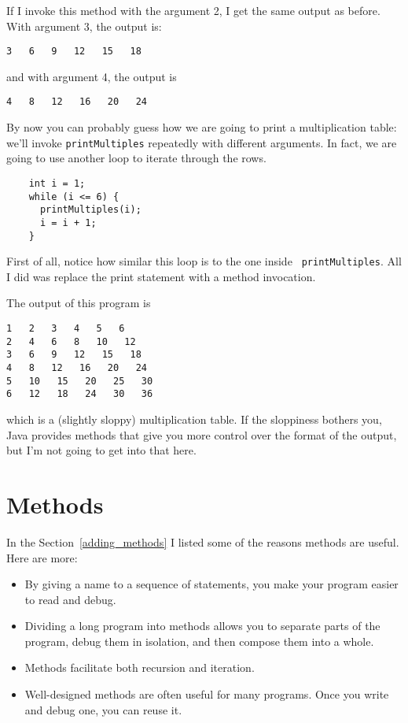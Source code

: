 \documentclass[12pt]{book}
\theoremstyle{definition}
\begin{document}
If I invoke this method with the argument 2, I get the same
output as before.  With argument 3, the output is:

\begin{lstlisting}
3   6   9   12   15   18
\end{lstlisting}
%
and with argument 4, the output is

\begin{lstlisting}
4   8   12   16   20   24 
\end{lstlisting}
%
By now you can probably guess how we are going to print a
multiplication table: we'll invoke {\tt printMultiples} repeatedly with
different arguments.  In fact, we are going to use another loop to
iterate through the rows.

\begin{lstlisting}
    int i = 1;
    while (i <= 6) {
      printMultiples(i);
      i = i + 1;
    }    
\end{lstlisting}
%
First of all, notice how similar this loop is to the one inside {\tt
printMultiples}.  All I did was replace the print statement with a
method invocation.

The output of this program is

\begin{lstlisting}
1   2   3   4   5   6   
2   4   6   8   10   12   
3   6   9   12   15   18   
4   8   12   16   20   24   
5   10   15   20   25   30   
6   12   18   24   30   36   
\end{lstlisting}
%
which is a (slightly sloppy) multiplication table.  If the
sloppiness bothers you, Java provides methods that give you
more control over the format of the output, but I'm not
going to get into that here.


\section{Methods}
\label{methods}

In the Section~\ref{adding_methods} I listed some of the
reasons methods are useful.  Here are more:

\begin{itemize}

\item By giving a name to a sequence of statements, you make
your program easier to read and debug.

\item Dividing a long program into methods allows you to
separate parts of the program, debug them in isolation, and
then compose them into a whole.

\item Methods facilitate both recursion and iteration.

\item Well-designed methods are often useful for many programs.
Once you write and debug one, you can reuse it.

\end{itemize}
\end{document}
